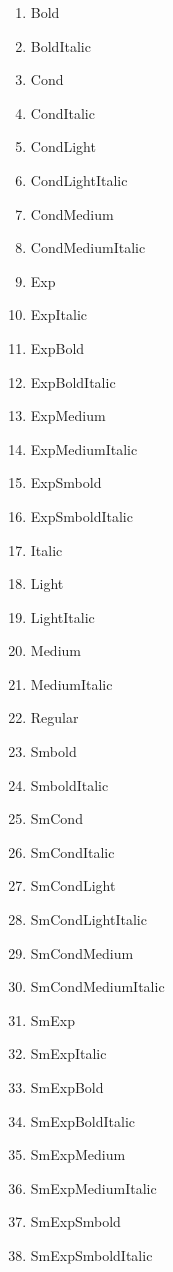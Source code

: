 \documentclass{article}
\begin{document}
\begin{enumerate}
\item {\jBold Bold}
\item {\jBoldItalic BoldItalic}
\item {\jCond Cond}
\item {\jCondItalic CondItalic}
\item {\jCondLight CondLight}
\item {\jCondLightItalic CondLightItalic}
\item {\jCondMedium CondMedium}
\item {\jCondMediumItalic CondMediumItalic}
\item {\jExp Exp}
\item {\jExpItalic ExpItalic}
\item {\jExpBold ExpBold}
\item {\jExpBoldItalic ExpBoldItalic}
\item {\jExpMedium ExpMedium}
\item {\jExpMediumItalic ExpMediumItalic}
\item {\jExpSmbold ExpSmbold}
\item {\jExpSmboldItalic ExpSmboldItalic}
\item {\jItalic Italic}
\item {\jLight Light}
\item {\jLightItalic LightItalic}
\item {\jMedium Medium}
\item {\jMediumItalic MediumItalic}
\item {\jRegular Regular}
\item {\jSmbold Smbold}
\item {\jSmboldItalic SmboldItalic}
\item {\jSmCond SmCond}
\item {\jSmCondItalic SmCondItalic}
\item {\jSmCondLight SmCondLight}
\item {\jSmCondLightItalic SmCondLightItalic}
\item {\jSmCondMedium SmCondMedium}
\item {\jSmCondMediumItalic SmCondMediumItalic}
\item {\jSmExp SmExp}
\item {\jSmExpItalic SmExpItalic}
\item {\jSmExpBold SmExpBold}
\item {\jSmExpBoldItalic SmExpBoldItalic}
\item {\jSmExpMedium SmExpMedium}
\item {\jSmExpMediumItalic SmExpMediumItalic}
\item {\jSmExpSmbold SmExpSmbold}
\item {\jSmExpSmboldItalic SmExpSmboldItalic}
\end{enumerate}
\end{document}

